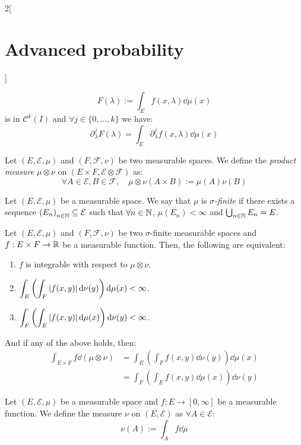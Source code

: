 \documentclass[../../../main_math.tex]{subfiles}
\begin{document}
\begin{multicols}{2}[\section{Advanced probability}]
\begin{proposition}
    $$
      F(\lambda):=\int_E{f(x,\lambda)\dd{\mu(x)}}
    $$
    is in $\mathcal{C}^k(I)$ and $\forall j\in\{0,\ldots,k\}$ we have:
    $$
      \partial_\lambda^j F(\lambda)=\int_E{\partial_\lambda^j f(x,\lambda)\dd{\mu(x)}}
    $$
  \end{proposition}
  \begin{definition}
    Let $(E,\mathcal{E},\mu)$ and $(F,\mathcal{F},\nu)$ be two measurable spaces. We define the \emph{product measure} $\mu\otimes\nu$ on $(E\times F,\mathcal{E}\otimes\mathcal{F})$ as:
    $$
      \forall A\in\mathcal{E}, B\in\mathcal{F}, \quad \mu\otimes\nu(A\times B):=\mu(A)\nu(B)
    $$
  \end{definition}
  \begin{definition}
    Let $(E,\mathcal{E},\mu)$ be a measurable space. We say that $\mu$ is \emph{$\sigma$-finite} if there exists a sequence ${(E_n)}_{n\in\mathbb{N}}\subseteq \mathcal{E}$ such that $\forall n\in\mathbb{N}$, $\mu(E_n)<\infty$ and $\bigcup_{n\in\mathbb{N}}{E_n}=E$.
  \end{definition}
  \begin{theorem}[Fubini]
    Let $(E,\mathcal{E},\mu)$ and $(F,\mathcal{F},\nu)$ be two $\sigma$-finite measurable spaces and $f:E\times F\to \mathbb{R}$ be a measurable function. Then, the following are equivalent:
    \begin{enumerate}
      \item $f$ is integrable with respect to $\mu\otimes\nu$.
      \item $\displaystyle\int_E{\left(\int_F{\abs{f(x,y)}\dd{\nu(y)}}\right)\dd{\mu(x)}}<\infty$.
      \item $\displaystyle\int_F{\left(\int_E{\abs{f(x,y)}\dd{\mu(x)}}\right)\dd{\nu(y)}}<\infty$.
    \end{enumerate}
    And if any of the above holds, then:
    \begin{align*}
      \int_{E\times F}{f\dd{(\mu\otimes\nu)}} & =\int_E{\left(\int_F{f(x,y)\dd{\nu(y)}}\right)\dd{\mu(x)}} \\
                                              & =\int_F{\left(\int_E{f(x,y)\dd{\mu(x)}}\right)\dd{\nu(y)}}
    \end{align*}
  \end{theorem}
  \begin{definition}
    Let $(E,\mathcal{E},\mu)$ be a measurable space and $f:E\to [0,\infty]$ be a measurable function. We define the measure $\nu$ on $(E,\mathcal{E})$ as $\forall A\in\mathcal{E}$:
    $$
      \nu(A):=\int_A{f\dd{\mu}}
    $$

\end{definition}
\end{multicols}
\end{document}
